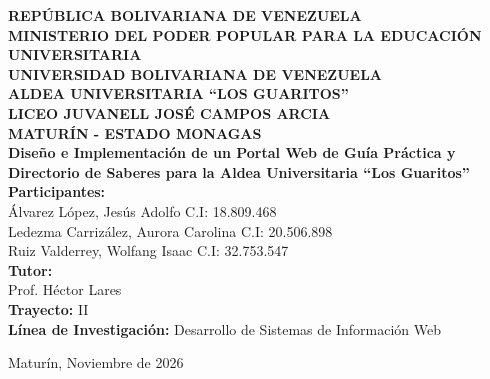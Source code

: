 \documentclass[12pt, letterpaper]{article}
\begin{document}
\begin{titlepage}
	\singlespacing 
	\centering
	\vspace*{0.5cm}
	
	{\bfseries\large REPÚBLICA BOLIVARIANA DE VENEZUELA}\\[0.2cm]
	{\bfseries\large MINISTERIO DEL PODER POPULAR PARA LA EDUCACIÓN UNIVERSITARIA}\\[0.2cm]
	{\bfseries\large UNIVERSIDAD BOLIVARIANA DE VENEZUELA}\\[0.2cm]
	{\bfseries\large ALDEA UNIVERSITARIA “LOS GUARITOS”}\\[0.2cm]
	{\bfseries\large LICEO JUVANELL JOSÉ CAMPOS ARCIA}\\[0.2cm]
	{\bfseries\large MATURÍN - ESTADO MONAGAS}\\[1.5cm]
	
	{\bfseries\Large Diseño e Implementación de un Portal Web de Guía Práctica y Directorio de Saberes para la Aldea Universitaria “Los Guaritos”}\\[1.5cm]
	
	{\large \textbf{Participantes:}}\\[0.3cm]
	{\large Álvarez López, Jesús Adolfo \quad C.I: 18.809.468}\\[0.1cm]
	{\large Ledezma Carrizález, Aurora Carolina \quad C.I: 20.506.898}\\[0.1cm]
	{\large Ruiz Valderrey, Wolfang Isaac \quad C.I: 32.753.547}\\[1cm]
	
	{\large \textbf{Tutor:}}\\[0.3cm]
	{\large Prof. Héctor Lares}\\[1.5cm]
	
	{\large \textbf{Trayecto:} II}\\
	{\large \textbf{Línea de Investigación:} Desarrollo de Sistemas de Información Web}\\[1.5cm]
	
	\vfill
	
	{\large Maturín, Noviembre de 2026}
	
	\doublespacing %
	\end{titlepage}

	\tableofcontents
	
\end{document}
